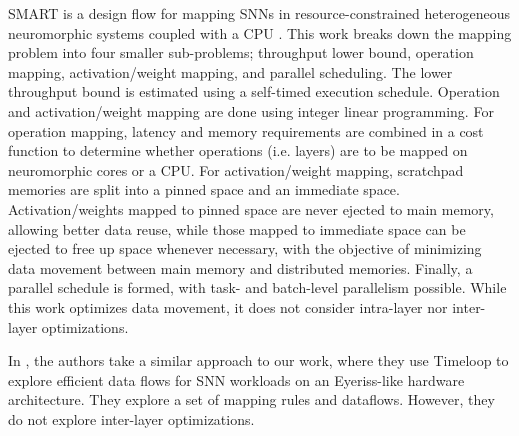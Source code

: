 SMART is a design flow for mapping SNNs in resource-constrained heterogeneous neuromorphic systems coupled with a CPU \cite{das2022realtime}. This work breaks down the mapping problem into four smaller sub-problems; throughput lower bound, operation mapping, activation/weight mapping, and parallel scheduling. The lower throughput bound is estimated using a self-timed execution schedule. Operation and activation/weight mapping are done using integer linear programming. For operation mapping, latency and memory requirements are combined in a cost function to determine whether operations (i.e. layers) are to be mapped on neuromorphic cores or a CPU. For activation/weight mapping, scratchpad memories are split into a pinned space and an immediate space. Activation/weights mapped to pinned space are never ejected to main memory, allowing better data reuse, while those mapped to immediate space can be ejected to free up space whenever necessary, with the objective of minimizing data movement between main memory and distributed memories. Finally, a parallel schedule is formed, with task- and batch-level parallelism possible. While this work optimizes data movement, it does not consider intra-layer nor inter-layer optimizations.





In \cite{10.1145/3531437.3539704}, the authors take a similar approach to our work, where they use Timeloop \cite{9923807} to explore efficient data flows for SNN workloads on an Eyeriss-like hardware architecture\cite{7738524}. They explore a set of mapping rules and dataflows. However, they do not explore inter-layer optimizations. 


